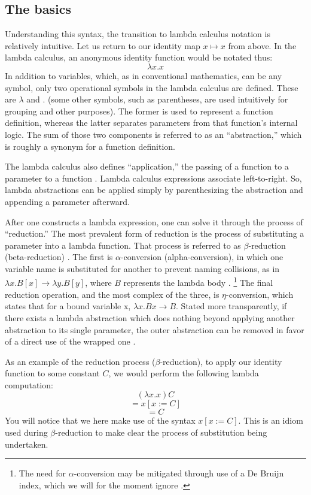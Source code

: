 \documentclass[twocolumn,titlepage,12pt]{article}
\begin{document}
\subsection{The basics}
Understanding this syntax, the transition to lambda calculus notation is relatively intuitive. Let us return to our identity map $x\mapsto x$ from above. In the lambda calculus, an anonymous identity function would be notated thus:
$$\lambda x.x$$
In addition to variables, which, as in conventional mathematics, can be any symbol, only two operational symbols in the lambda calculus are defined. These are $\lambda$ and $.$ (some other symbols, such as parentheses, are used intuitively for grouping and other purposes). The former is used to represent a function definition, whereas the latter separates parameters from that function's internal logic. The sum of those two components is referred to as an ``abstraction,'' which is roughly a synonym for a function definition.

The lambda calculus also defines ``application,'' the passing of a  function to a parameter to a function \cite{horowitz}. Lambda calculus expressions associate left-to-right. So, lambda abstractions can be applied simply by parenthesizing the abstraction and appending a parameter afterward.

After one constructs a lambda expression, one can solve it through the process of ``reduction.'' The most prevalent form of reduction is the process of substituting a parameter into a lambda function. That process is referred to as $\beta$-reduction (beta-reduction) \cite{hudakintro}. The first is $\alpha$-conversion (alpha-conversion), in which one variable name is substituted for another to prevent naming collisions, as in $\lambda x.B[x] \to \lambda y.B[y]$, where $B$ represents the lambda body \cite{hudakintro}. \footnote{The need for $\alpha$-conversion may be mitigated through use of a De Bruijn index, which we will for the moment ignore \cite{debruijn}.} The final reduction operation, and the most complex of the three, is $\eta$-conversion, which states that for a bound variable x, $\lambda x.Bx \to B$. Stated more transparently, if there exists a lambda abstraction which does nothing beyond applying another abstraction to its single parameter, the outer abstraction can be removed in favor of a direct use of the wrapped one \cite{etared}.

As an example of the reduction process ($\beta$-reduction), to apply our identity function to some constant $C$, we would perform the following lambda computation:
$$(\lambda x.x)C$$
$$=x[x:=C]$$
$$=C$$
You will notice that we here make use of the syntax $x[x:=C]$. This is an idiom used during $\beta$-reduction to make clear the process of substitution being undertaken.
\end{document}

